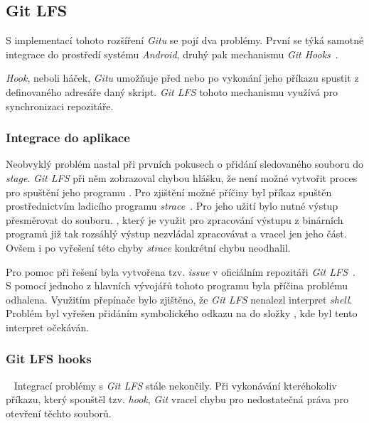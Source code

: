     \newpage
    \subsection{Git LFS}\label{sec:problemy_lfs}
    S implementací tohoto rozšíření \emph{Gitu} se pojí dva problémy. První se týká samotné integrace do prostředí systému \emph{Android}, druhý pak mechanismu \emph{Git Hooks}~.

    \emph{Hook}, neboli háček, \emph{Gitu} umožňuje před nebo po vykonání jeho příkazu spustit z definovaného adresáře daný skript. \emph{Git LFS} tohoto mechanismu využívá pro synchronizaci repozitáře.

    \subsubsection{Integrace do aplikace}
    Neobvyklý problém nastal při prvních pokusech o přidání sledovaného souboru do \emph{stage}. \emph{Git LFS} při něm zobrazoval chybou hlášku, že není možné vytvořit proces pro spuštění jeho programu . Pro zjištění možné příčiny byl příkaz  spuštěn prostřednictvím ladicího programu \emph{strace}~. Pro jeho užití bylo nutné výstup přesměrovat do souboru. , který je využit pro zpracování výstupu z binárních programů již tak rozsáhlý výstup nezvládal zpracovávat a vracel jen jeho část. Ovšem i po vyřešení této chyby \emph{strace} konkrétní chybu neodhalil.
    
    Pro pomoc při řešení byla vytvořena tzv. \emph{issue} v oficiálním repozitáři \emph{Git LFS}~. S pomocí jednoho z hlavních vývojářů tohoto programu byla příčina problému odhalena. Využitím přepínače  bylo zjištěno, že \emph{Git LFS} nenalezl interpret \emph{shell}. Problém byl vyřešen přidáním symbolického odkazu na  do složky , kde byl tento interpret očekáván.

    \subsubsection{Git LFS hooks}~\label{subsub:problemy_git_hooks}
    Integrací problémy s \emph{Git LFS} stále nekončily. Při vykonávání kteréhokoliv příkazu, který spouštěl tzv. \emph{hook}, \emph{Git} vracel chybu pro nedostatečná práva pro otevření těchto souborů.
    
